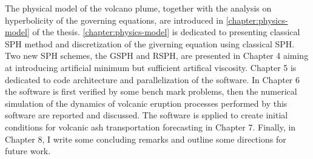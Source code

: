 The physical model of the volcano plume, together with the analysis on hyperbolicity of the governing equations, are introduced in \ref{chapter:physics-model} of the thesis. \ref{chapter:physics-model} is dedicated to presenting
classical SPH method and discretization of the giverning equation using classical SPH. Two new SPH schemes, the GSPH and RSPH, are presented in Chapter 4 aiming at introducing artificial minimum but sufficient artifical viscosity. Chapter 5 is dedicated to
code architecture and parallelization of the software. In Chapter 6 the software is first verified by some bench mark problems, then the numerical simulation of the dynamics of volcanic eruption processes
performed by this software are reported and discussed. The software is spplied to create initial conditions for volcanic ash transportation forecasting in Chapter 7. Finally, in Chapter 8, I
write some concluding remarks and outline some directions for future work.